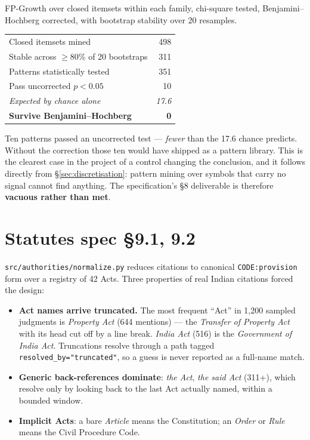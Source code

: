 \documentclass[12pt,a4paper]{article}
\newcommand{\code}[1]{\texttt{\small #1}}
\newcommand{\spec}[1]{\textbf{spec §#1}}
\begin{document}
FP-Growth over closed itemsets within each family, chi-square tested, Benjamini--Hochberg corrected,
with bootstrap stability over 20 resamples.

\begin{center}
\begin{tabular}{@{}lr@{}}
\toprule
Closed itemsets mined & 498 \\
Stable across $\geq$80\% of 20 bootstraps & 311 \\
Patterns statistically tested & 351 \\
Pass uncorrected $p<0.05$ & 10 \\
\emph{Expected by chance alone} & \emph{17.6} \\
\textbf{Survive Benjamini--Hochberg} & \textbf{0} \\
\bottomrule
\end{tabular}
\end{center}

Ten patterns passed an uncorrected test --- \emph{fewer} than the 17.6 chance predicts. Without the
correction those ten would have shipped as a pattern library. This is the clearest case in the
project of a control changing the conclusion, and it follows directly from
§\ref{sec:discretisation}: pattern mining over symbols that carry no signal cannot find anything.
The specification's §8 deliverable is therefore \textbf{vacuous rather than met}.

\section{Statutes \spec{9.1, 9.2}}\label{sec:statutes}

\code{src/authorities/normalize.py} reduces citations to canonical \code{CODE:provision} form over a
registry of 42 Acts. Three properties of real Indian citations forced the design:

\begin{itemize}
\item \textbf{Act names arrive truncated.} The most frequent ``Act'' in 1,200 sampled judgments is
\emph{Property Act} (644 mentions) --- the \emph{Transfer of Property Act} with its head cut off by a
line break. \emph{India Act} (516) is the \emph{Government of India Act}. Truncations resolve through
a path tagged \code{resolved\_by="truncated"}, so a guess is never reported as a full-name match.
\item \textbf{Generic back-references dominate}: \emph{the Act}, \emph{the said Act} (311+), which
resolve only by looking back to the last Act actually named, within a bounded window.
\item \textbf{Implicit Acts}: a bare \emph{Article} means the Constitution; an \emph{Order} or
\emph{Rule} means the Civil Procedure Code.
\end{itemize}
\end{document}
